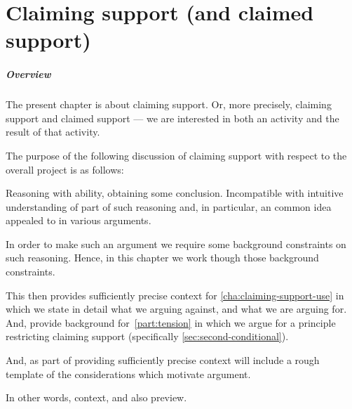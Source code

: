  \chapter{Claiming support (and claimed support)}
\label{cha:claiming-support}

\paragraph*{Overview}

\begin{note}
  The present chapter is about claiming support.
  Or, more precisely, claiming support and claimed support --- we are interested in both an activity and the result of that activity.

  The purpose of the following discussion of claiming support with respect to the {\color{red} overall project} is as follows:

  Reasoning with ability, obtaining some conclusion.
  Incompatible with intuitive understanding of part of such reasoning and, in particular, an common idea appealed to in various arguments.

  In order to make such an argument we require some background constraints on such reasoning.
  Hence, in this chapter we work though those background constraints.

  This then provides sufficiently precise context for \autoref{cha:claiming-support-use} in which we state in detail what we arguing against, and what we are arguing for.
  And, provide background for~\autoref{part:tension} in which we argue for a principle restricting claiming support (specifically \autoref{sec:second-conditional}).

  And, as part of providing sufficiently precise context will include a rough template of the considerations which motivate argument.

  In other words, context, and also preview.
\end{note}

